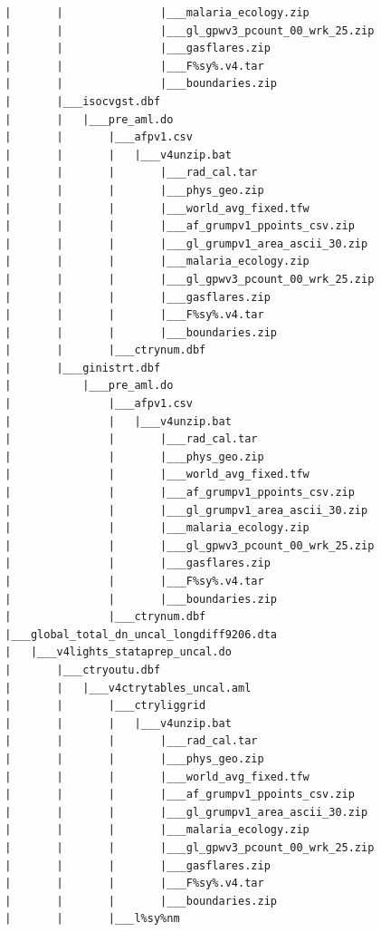\documentclass[]{book}
\begin{document}
\begin{verbatim}
        |       |               |___malaria_ecology.zip
        |       |               |___gl_gpwv3_pcount_00_wrk_25.zip
        |       |               |___gasflares.zip
        |       |               |___F%sy%.v4.tar
        |       |               |___boundaries.zip
        |       |___isocvgst.dbf
        |       |   |___pre_aml.do
        |       |       |___afpv1.csv
        |       |       |   |___v4unzip.bat
        |       |       |       |___rad_cal.tar
        |       |       |       |___phys_geo.zip
        |       |       |       |___world_avg_fixed.tfw
        |       |       |       |___af_grumpv1_ppoints_csv.zip
        |       |       |       |___gl_grumpv1_area_ascii_30.zip
        |       |       |       |___malaria_ecology.zip
        |       |       |       |___gl_gpwv3_pcount_00_wrk_25.zip
        |       |       |       |___gasflares.zip
        |       |       |       |___F%sy%.v4.tar
        |       |       |       |___boundaries.zip
        |       |       |___ctrynum.dbf
        |       |___ginistrt.dbf
        |           |___pre_aml.do
        |               |___afpv1.csv
        |               |   |___v4unzip.bat
        |               |       |___rad_cal.tar
        |               |       |___phys_geo.zip
        |               |       |___world_avg_fixed.tfw
        |               |       |___af_grumpv1_ppoints_csv.zip
        |               |       |___gl_grumpv1_area_ascii_30.zip
        |               |       |___malaria_ecology.zip
        |               |       |___gl_gpwv3_pcount_00_wrk_25.zip
        |               |       |___gasflares.zip
        |               |       |___F%sy%.v4.tar
        |               |       |___boundaries.zip
        |               |___ctrynum.dbf
        |___global_total_dn_uncal_longdiff9206.dta
        |   |___v4lights_stataprep_uncal.do
        |       |___ctryoutu.dbf
        |       |   |___v4ctrytables_uncal.aml
        |       |       |___ctryliggrid
        |       |       |   |___v4unzip.bat
        |       |       |       |___rad_cal.tar
        |       |       |       |___phys_geo.zip
        |       |       |       |___world_avg_fixed.tfw
        |       |       |       |___af_grumpv1_ppoints_csv.zip
        |       |       |       |___gl_grumpv1_area_ascii_30.zip
        |       |       |       |___malaria_ecology.zip
        |       |       |       |___gl_gpwv3_pcount_00_wrk_25.zip
        |       |       |       |___gasflares.zip
        |       |       |       |___F%sy%.v4.tar
        |       |       |       |___boundaries.zip
        |       |       |___l%sy%nm

\end{verbatim}
\end{document}

